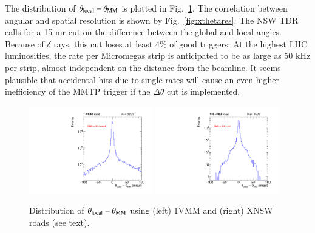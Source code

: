  The distribution of $\theta_{\rm local}-\theta_{\rm MM} $ is plotted in Fig.~\ref{fig:thetares}.
The correlation between angular and spatial resolution is shown by Fig.~\ref{fig:xthetares}.
 The NSW TDR  calls for a 15 mr cut on the difference between  the global and local angles.
 Because of $\delta$ rays, this cut  loses at least 4\% of good triggers. 
  At the highest LHC luminosities, the rate per Micromegas strip is anticipated to be 
 as large as 50 kHz per strip, almost independent on the distance from the beamline.
 It seems plausible that accidental hits due to single rates will cause an even higher inefficiency of the
 MMTP trigger if the $\Delta\theta$ cut is implemented.
\begin{figure}[!htpb]
  \begin{center}
    \includegraphics[width=0.48\textwidth]{figures/gbtanalysis3522/TP_angres_full.pdf}
    \includegraphics[width=0.48\textwidth]{figures/gbtanalysis3522/TP_angres.pdf}
  \end{center}
  \vspace{-10pt}
  \caption{Distribution of  $\theta_{\rm local}-\theta_{\rm MM} $ using  (left) 1VMM    and (right) XNSW  roads (see text). }
  \label{fig:thetares}
\end{figure}
